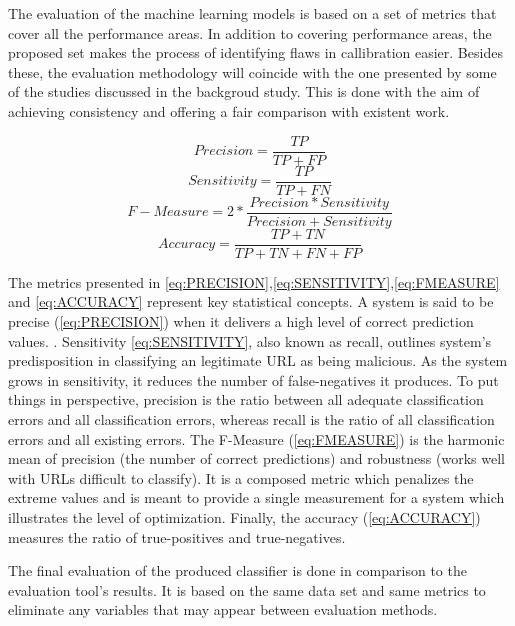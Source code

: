 The evaluation of the machine learning models is based on a set of metrics that cover all the performance areas. In addition to covering performance areas, the proposed set makes the process of identifying flaws in callibration easier. Besides these, the evaluation methodology will coincide with the one presented by some of the studies discussed in the backgroud study. This is done with the aim of achieving consistency and offering a fair comparison with existent work.\newline


\begin{equation}
	\label{eq:PRECISION}
	Precision = \frac{TP}{TP+FP}
\end{equation}
\begin{equation}
	\label{eq:SENSITIVITY}
	Sensitivity = \frac{TP}{TP+FN}
\end{equation}
\begin{equation}
	\label{eq:FMEASURE}
	F-Measure = 2*\frac{Precision * Sensitivity}{Precision + Sensitivity}
\end{equation}
\begin{equation}
	\label{eq:ACCURACY}
	Accuracy = \frac{TP+TN}{TP+TN+FN+FP}
\end{equation}
\newline

The metrics presented in \ref{eq:PRECISION},\ref{eq:SENSITIVITY},\ref{eq:FMEASURE} and \ref{eq:ACCURACY} represent key statistical concepts. A system is said to be precise (\ref{eq:PRECISION}) when it delivers a high level of correct prediction values. . Sensitivity \ref{eq:SENSITIVITY}, also known as recall, outlines system's predisposition in classifying an legitimate URL as being malicious. As the system grows in sensitivity, it reduces the number of false-negatives it produces. To put things in perspective, precision is the ratio between all adequate classification errors and all classification errors, whereas recall is the ratio of all classification errors and all existing errors.
The F-Measure (\ref{eq:FMEASURE}) is the harmonic mean of precision (the number of correct predictions) and robustness (works well with URLs difficult to classify). It is a composed metric which penalizes the extreme values and is meant to provide a single measurement for a system which illustrates the level of optimization. Finally, the accuracy (\ref{eq:ACCURACY}) measures the ratio of true-positives and true-negatives.

The final evaluation of the produced classifier is done in comparison to the evaluation tool's results. It is based on the same data set and same metrics to eliminate any variables that may appear between evaluation methods.

